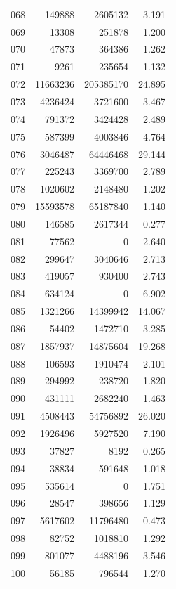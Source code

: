 \documentclass[anonymous,notoc]{gmcm2026}
\begin{document}
\begin{longtable}{lrrr}
068 & 149888 & 2605132 & 3.191 \\
069 & 13308 & 251878 & 1.200 \\
070 & 47873 & 364386 & 1.262 \\
071 & 9261 & 235654 & 1.132 \\
072 & 11663236 & 205385170 & 24.895 \\
073 & 4236424 & 3721600 & 3.467 \\
074 & 791372 & 3424428 & 2.489 \\
075 & 587399 & 4003846 & 4.764 \\
076 & 3046487 & 64446468 & 29.144 \\
077 & 225243 & 3369700 & 2.789 \\
078 & 1020602 & 2148480 & 1.202 \\
079 & 15593578 & 65187840 & 1.140 \\
080 & 146585 & 2617344 & 0.277 \\
081 & 77562 & 0 & 2.640 \\
082 & 299647 & 3040646 & 2.713 \\
083 & 419057 & 930400 & 2.743 \\
084 & 634124 & 0 & 6.902 \\
085 & 1321266 & 14399942 & 14.067 \\
086 & 54402 & 1472710 & 3.285 \\
087 & 1857937 & 14875604 & 19.268 \\
088 & 106593 & 1910474 & 2.101 \\
089 & 294992 & 238720 & 1.820 \\
090 & 431111 & 2682240 & 1.463 \\
091 & 4508443 & 54756892 & 26.020 \\
092 & 1926496 & 5927520 & 7.190 \\
093 & 37827 & 8192 & 0.265 \\
094 & 38834 & 591648 & 1.018 \\
095 & 535614 & 0 & 1.751 \\
096 & 28547 & 398656 & 1.129 \\
097 & 5617602 & 11796480 & 0.473 \\
098 & 82752 & 1018810 & 1.292 \\
099 & 801077 & 4488196 & 3.546 \\
100 & 56185 & 796544 & 1.270 \\
\end{longtable}
\end{document}
